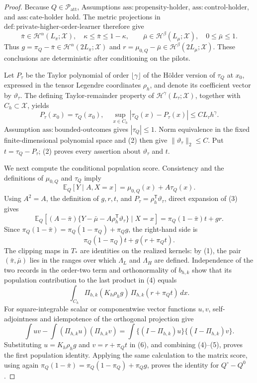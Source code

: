 \documentclass{article}
\begin{document}
\begin{proof}
Because \(Q\in\mathcal P_{\mathrm{att}}\), Assumptions \(\mathrm{ass{:}propensity\text{-}holder}\), \(\mathrm{ass{:}control\text{-}holder}\), and \(\mathrm{ass{:}cate\text{-}holder}\) hold.  The metric projections in \(\mathrm{def{:}private\text{-}higher\text{-}order\text{-}learner}\) therefore give
\[
 \bar\pi\in\mathcal H^\alpha(L_\pi;\mathcal X),\quad
 \kappa\le\bar\pi\le1-\kappa,
 \qquad
 \bar\mu\in\mathcal H^\beta(L_\mu;\mathcal X),\quad
 0\le\bar\mu\le1.
\tag{1}
\]
Thus \(g=\pi_Q-\bar\pi\in\mathcal H^\alpha(2L_\pi;\mathcal X)\) and \(r=\mu_{0,Q}-\bar\mu\in\mathcal H^\beta(2L_\mu;\mathcal X)\).  These conclusions are deterministic after conditioning on the pilots.

Let \(P_\tau\) be the Taylor polynomial of order \(\lfloor\gamma\rfloor\) of the H\"older version of \(\tau_Q\) at \(x_0\), expressed in the tensor Legendre coordinates \(\rho_h\), and denote its coefficient vector by \(\vartheta_\tau\).  The defining Taylor-remainder property of \(\mathcal H^\gamma(L_\tau;\mathcal X)\), together with \(C_h\subset\mathcal X\), yields
\[
 P_\tau(x_0)=\tau_Q(x_0),\quad
 \sup_{x\in C_h}|\tau_Q(x)-P_\tau(x)|\le C L_\tau h^\gamma.
\tag{2}
\]
Assumption \(\mathrm{ass{:}bounded\text{-}outcomes}\) gives \(|\tau_Q|\le1\).  Norm equivalence in the fixed finite-dimensional polynomial space and (2) then give \(\lVert\vartheta_\tau\rVert_2\le C\).  Put \(t=\tau_Q-P_\tau\); (2) proves every assertion about \(\vartheta_\tau\) and \(t\).

We next compute the conditional population score.  Consistency and the definitions of \(\mu_{0,Q}\) and \(\tau_Q\) imply
\[
 \mathbb E_Q[Y\mid A,X=x]=\mu_{0,Q}(x)+A\tau_Q(x).
\tag{3}
\]
Using \(A^2=A\), the definition of \(g,r,t\), and \(P_\tau=\rho_h^{\mathsf T}\vartheta_\tau\), direct expansion of (3) gives
\[
 \mathbb E_Q\!\left[(A-\bar\pi)
       \{Y-\bar\mu-A\rho_h^{\mathsf T}\vartheta_\tau\}\mid X=x\right]
 =\pi_Q(1-\bar\pi)t+gr.
\]
Since \(\pi_Q(1-\bar\pi)=\pi_Q(1-\pi_Q)+\pi_Qg\), the right-hand side is
\[
 \pi_Q(1-\pi_Q)t+g(r+\pi_Qt).
\tag{4}
\]
The clipping maps in \(T_*\) are identities on the realized kernels: by (1), the pair \((\bar\pi,\bar\mu)\) lies in the ranges over which \(\Lambda_L\) and \(\Lambda_H\) are defined.  Independence of the two records in the order-two term and orthonormality of \(b_{h,k}\) show that its population contribution to the last product in (4) equals
\[
 \int_{C_h}\Pi_{h,k}(K_h\rho_hg)\,
                  \Pi_{h,k}(r+\pi_Qt)\,dx.
\tag{5}
\]
For square-integrable scalar or componentwise vector functions \(u,v\), self-adjointness and idempotence of the orthogonal projection give
\[
 \int uv-\int(\Pi_{h,k}u)(\Pi_{h,k}v)
 =\int\{(I-\Pi_{h,k})u\}\{(I-\Pi_{h,k})v\}.
\tag{6}
\]
Substituting \(u=K_h\rho_hg\) and \(v=r+\pi_Qt\) in (6), and combining (4)--(5), proves the first population identity.  Applying the same calculation to the matrix score, using again \(\pi_Q(1-\bar\pi)=\pi_Q(1-\pi_Q)+\pi_Qg\), proves the identity for \(Q^\circ-Q^0\).


\end{proof}
\end{document}
